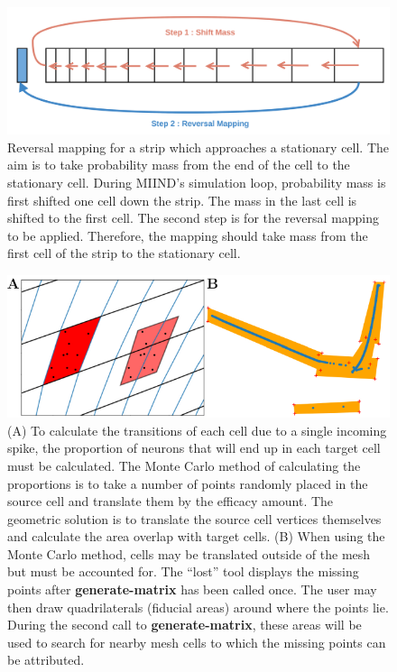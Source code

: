 \documentclass[utf8]{frontiers_suppmat} %
\begin{document}
\begin{figure}[!htb]
  \centering
  \includegraphics[width=\columnwidth]{images/reversal.png}
  \caption{Reversal mapping for a strip which approaches a stationary cell. The aim is to take probability mass from the end of the cell to the stationary cell. During MIIND's simulation loop, probability mass is first shifted one cell down the strip. The mass in the last cell is shifted to the first cell. The second step is for the reversal mapping to be applied. Therefore, the mapping should take mass from the first cell of the strip to the stationary cell.}
  \label{fig:reversal}
\end{figure}

\begin{figure}[tb]
  \centering
    \includegraphics[width=\linewidth]{images/lost_full_figure.pdf}
  \caption{(A) To calculate the transitions of each cell due to a single incoming spike, the proportion of neurons that will end up in each target cell must be calculated. The Monte Carlo method of calculating the proportions is to take a number of points randomly placed in the source cell and translate them by the efficacy amount. The geometric solution is to translate the source cell vertices themselves and calculate the area overlap with target cells. (B) When using the Monte Carlo method, cells may be translated outside of the mesh but must be accounted for. The ``lost'' tool displays the missing points after \textbf{generate-matrix} has been called once. The user may then draw quadrilaterals (fiducial areas) around where the points lie. During the second call to \textbf{generate-matrix}, these areas will be used to search for nearby mesh cells to which the missing points can be attributed.}
  \label{fig:transitionlost}
\end{figure}
\end{document}
